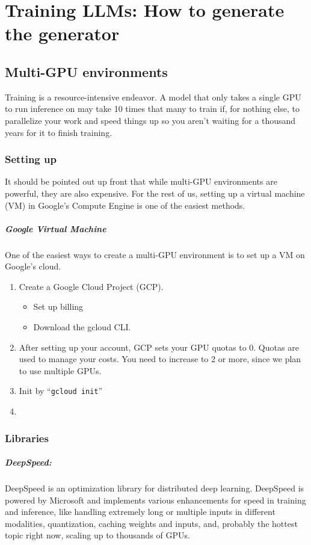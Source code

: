 \chapter{Training LLMs: How to generate the generator}

\section{Multi-GPU environments}
Training is a resource-intensive endeavor. A model that only takes a single GPU to run inference on may take 10 times that many to train if, for nothing else, to parallelize your work and speed things up so you aren't waiting for a thousand years for it to finish training.  

\subsection{Setting up} 
It should be pointed out up front that while multi-GPU environments are powerful, they are also expensive. For the rest of us, setting up a virtual machine (VM) in Google's Compute Engine is one of the easiest methods. 
\paragraph{Google Virtual Machine} One of the easiest ways to create a multi-GPU environment is to set up a VM on Google's cloud. 
\begin{enumerate}
	\item Create a Google Cloud Project (GCP).
		\begin{itemize}
			\item Set up billing
			\item Download the gcloud CLI. 
		\end{itemize}
	\item After setting up your account, GCP sets your GPU quotas to 0. Quotas are used to manage your costs. You need to increase to 2 or more, since we plan to use multiple GPUs.  
	\item Init by ``\texttt{gcloud init}''
	\item 
\end{enumerate}

\subsection{Libraries}

\paragraph{DeepSpeed:} DeepSpeed is an optimization library for distributed deep learning. DeepSpeed is powered by Microsoft and implements various enhancements for speed in training and inference, like handling extremely long or multiple inputs in different modalities, quantization, caching weights and inputs, and, probably the hottest topic right now, scaling up to thousands of GPUs.  


